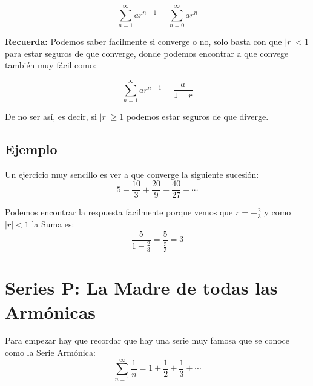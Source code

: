 \documentclass[12pt]{report}                                %
\begin{document}
        \begin{equation}
            \sum_{n=1}^{\infty} ar^{n-1} = \sum_{n=0}^{\infty} ar^n 
        \end{equation}

        \textbf{Recuerda:}
        Podemos saber facilmente si converge o no, solo basta con que $|r| < 1$ 
        para estar seguros de que converge, donde podemos encontrar a que convege
        también muy fácil como:

        \begin{equation}
            \sum_{n=1}^{\infty} ar^{n-1} = \frac{a}{1-r}
        \end{equation}

        De no ser así, es decir, si $|r| \geq 1$ podemos estar seguros de que diverge.


        \subsection{Ejemplo}
        Un ejercicio muy sencillo es ver a que converge la siguiente sucesión:
        \begin{equation*}
            5 - \frac{10}{3} + \frac{20}{9} - \frac{40}{27} + \cdots
        \end{equation*}

        Podemos encontrar la respuesta facilmente porque vemos que
        $r=-\frac{2}{3}$ y como $|r|<1$ la Suma es:
        \begin{equation*}
            \frac{5}{1-\frac{2}{3}} = \frac{5}{\frac{5}{3}} = 3
        \end{equation*}



    \clearpage
    \section{Series P: La Madre de todas las Armónicas}
        Para empezar hay que recordar que hay una serie muy famosa que se conoce como
        la Serie Armónica:
        \begin{equation}
            \sum_{n=1}^{\infty} \frac{1}{n} = 1 + \frac{1}{2}  + \frac{1}{3} + \cdots
        \end{equation}
\end{document}
